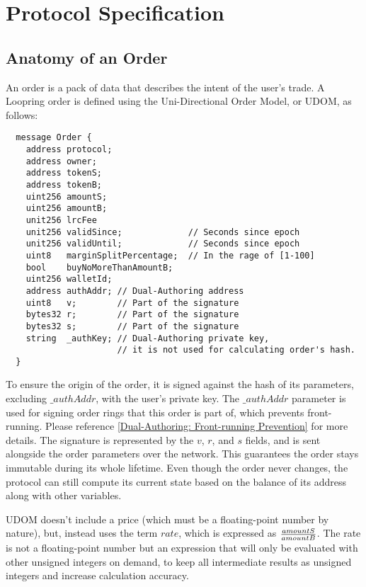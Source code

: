 \documentclass[UTF8,nofonts]{article}
\begin{document}
\section{Protocol Specification}

\subsection{Anatomy of an Order\label{anatomy}}
An order is a pack of data that describes the intent of the user's trade. A Loopring order is defined using the Uni-Directional Order Model, or UDOM, as follows:

\begin{verbatim}
  message Order {
    address protocol;
    address owner;
    address tokenS;
    address tokenB;
    uint256 amountS;
    uint256 amountB;
    unit256 lrcFee
    unit256 validSince;             // Seconds since epoch
    unit256 validUntil;             // Seconds since epoch
    uint8   marginSplitPercentage;  // In the rage of [1-100]
    bool    buyNoMoreThanAmountB;
    uint256 walletId;
    address authAddr; // Dual-Authoring address
    uint8   v;        // Part of the signature
    bytes32 r;        // Part of the signature
    bytes32 s;        // Part of the signature
    string  _authKey; // Dual-Authoring private key,
                      // it is not used for calculating order's hash.
  }
\end{verbatim}
To ensure the origin of the order, it is signed against the hash of its parameters, excluding $\_authAddr$, with the user's private key. The $\_authAddr$ parameter is used for signing  order rings that this order is part of, which prevents front-running. Please reference \ref{Dual-Authoring: Front-running Prevention} for more details. The signature is represented by the $v$, $r$, and $s$ fields, and is sent alongside the order parameters over the network. This guarantees the order stays immutable during its whole lifetime. Even though the order never changes, the protocol can still compute its current state based on the balance of its address along with other variables.

UDOM doesn't include a price (which must be a floating-point number by nature), but, instead uses the term $rate$, which is expressed as $amountS \over amountB$. The rate is not a floating-point number but an expression that will only be evaluated with other unsigned integers on demand, to keep all intermediate results as unsigned integers and increase calculation accuracy. 
\end{document}
